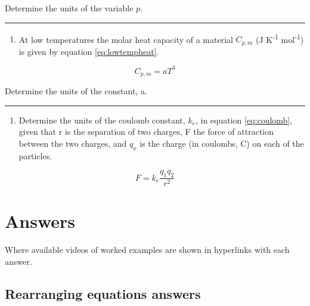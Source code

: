 \documentclass[
]{book}
\providecommand{\tightlist}{%
  \setlength{\itemsep}{0pt}\setlength{\parskip}{0pt}}
\begin{document}
Determine the units of the variable \(p\).

\begin{center}\rule{0.5\linewidth}{0.5pt}\end{center}

\begin{enumerate}
\def\labelenumi{\arabic{enumi}.}
\setcounter{enumi}{2}
\tightlist
\item
  At low temperatures the molar heat capacity of a material \(C_{p, m}\) (J K\textsuperscript{-1} mol\textsuperscript{-1}) is given by equation \eqref{eq:lowtempheat}.
\end{enumerate}

\begin{equation}
C_{p, m}= a T^3
\label{eq:lowtempheat}
\end{equation}

Determine the units of the constant, a.

\begin{center}\rule{0.5\linewidth}{0.5pt}\end{center}

\begin{enumerate}
\def\labelenumi{\arabic{enumi}.}
\setcounter{enumi}{3}
\tightlist
\item
  Determine the units of the coulomb constant, \(k_e\), in equation \eqref{eq:coulomb}, given that r is the separation of two charges, F the force of attraction between the two charges, and \(q_x\) is the charge (in coulombs, C) on each of the particles.
\end{enumerate}

\begin{equation}
F = k_e \frac{q_1 q_2}{r^2}
\label{eq:coulomb}
\end{equation}

\hypertarget{sec:Answers}{%
\section{Answers}\label{sec:Answers}}

Where available videos of worked examples are shown in hyperlinks with each answer.

\hypertarget{subsec:rearrangeans}{%
\subsection{Rearranging equations answers}\label{subsec:rearrangeans}}
\end{document}
